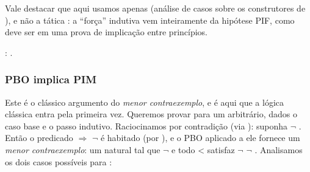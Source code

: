     Vale destacar que aqui usamos apenas  (análise de
    casos sobre os construtores de ), e não a tática
    : a ``força'' indutiva vem inteiramente da hipótese
    PIF, como deve ser em uma prova de implicação entre princípios. 
\begin{coqdoccode}
\coqdocemptyline
\coqdocnoindent
{} :   .\coqdoceol
\coqdocemptyline
\end{coqdoccode}
\subsubsection{PBO implica PIM}




    Este é o clássico argumento do \textit{menor contraexemplo}, e é aqui
    que a lógica clássica entra pela primeira vez. Queremos provar
      para um  arbitrário, dados o caso base e o passo
    indutivo. Raciocinamos por contradição (via ): suponha
    \ensuremath{\lnot}  . Então o predicado   \ensuremath{\Rightarrow} \ensuremath{\lnot}   é habitado (por ),
    e o PBO aplicado a ele fornece um \textit{menor contraexemplo}: um
    natural  tal que \ensuremath{\lnot}   e todo  <  satisfaz \ensuremath{\lnot} \ensuremath{\lnot}  .
    Analisamos os dois casos possíveis para :



